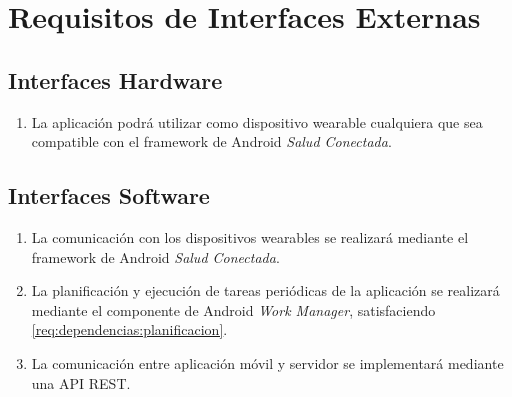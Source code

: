 \section{Requisitos de Interfaces Externas}
    \label{req:externas}

    \subsection{Interfaces Hardware}
        \label{req:externas:hardware}

        \begin{enumerate}[label=\textbf{\texttt{RIS-\arabic*}}]
            \item La aplicación podrá utilizar como dispositivo \gls{wearable} cualquiera que sea compatible con el \gls{framework} de Android \textit{Salud Conectada}.
        \end{enumerate}
    
    \subsection{Interfaces Software}
        \label{req:externas:software}
        \begin{enumerate}[label=\textbf{\texttt{RIS-\arabic*}}]
            \item La comunicación con los dispositivos \glspl{wearable} se realizará mediante el \gls{framework} de Android \textit{Salud Conectada}.
            \item La planificación y ejecución de tareas periódicas de la aplicación se realizará mediante el componente de Android \textit{Work Manager}, satisfaciendo \ref{req:dependencias:planificacion}.
            \item \label{req:externas:api} La comunicación entre aplicación móvil y servidor se implementará mediante una API REST.
        \end{enumerate}
